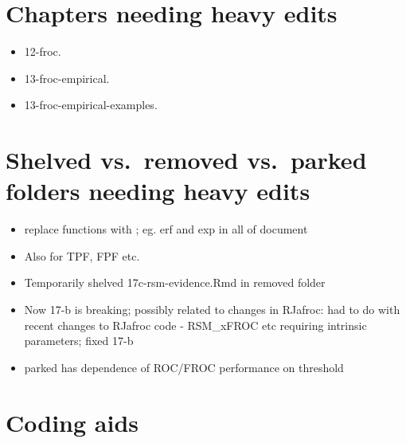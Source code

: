 \documentclass[
]{book}
\providecommand{\tightlist}{%
  \setlength{\itemsep}{0pt}\setlength{\parskip}{0pt}}
\begin{document}
\hypertarget{chapters-needing-heavy-edits}{%
\section*{Chapters needing heavy edits}\label{chapters-needing-heavy-edits}}

\begin{itemize}
\tightlist
\item
  12-froc.
\item
  13-froc-empirical.
\item
  13-froc-empirical-examples.
\end{itemize}

\hypertarget{shelved-vs.-removed-vs.-parked-folders-needing-heavy-edits}{%
\section*{Shelved vs.~removed vs.~parked folders needing heavy edits}\label{shelved-vs.-removed-vs.-parked-folders-needing-heavy-edits}}

\begin{itemize}
\tightlist
\item
  replace functions with \text{}; eg. erf and exp in all of document
\item
  Also for TPF, FPF etc.
\item
  Temporarily shelved 17c-rsm-evidence.Rmd in removed folder
\item
  Now 17-b is breaking; possibly related to changes in RJafroc: had to do with recent changes to RJafroc code - RSM\_xFROC etc requiring intrinsic parameters; fixed 17-b
\item
  parked has dependence of ROC/FROC performance on threshold
\end{itemize}

\hypertarget{coding-aids}{%
\section*{Coding aids}\label{coding-aids}}
\end{document}
